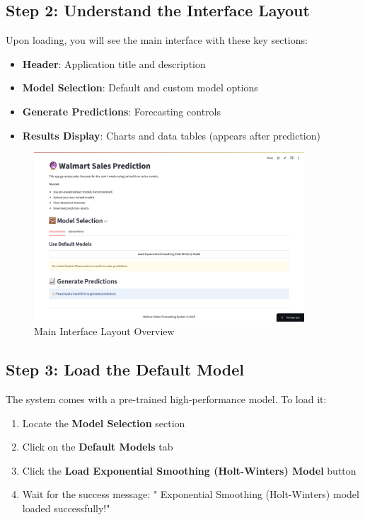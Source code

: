 \subsection{Step 2: Understand the Interface Layout}

Upon loading, you will see the main interface with these key sections:

\begin{itemize}
	\item \textbf{Header}: Application title and description
	\item \textbf{Model Selection}: Default and custom model options
	\item \textbf{Generate Predictions}: Forecasting controls
	\item \textbf{Results Display}: Charts and data tables (appears after prediction)
\end{itemize}

\begin{figure}[H]
	\centering
	\includegraphics[width=0.9\textwidth]{Images/03FirstStepsGuide/InterfaceLayout.png}
	\caption{Main Interface Layout Overview}
	\label{fig:interface_layout}
\end{figure}

\subsection{Step 3: Load the Default Model}

The system comes with a pre-trained high-performance model. To load it:

\begin{enumerate}
	\item Locate the \textbf{Model Selection} section
	\item Click on the \textbf{Default Models} tab
	\item Click the \textbf{Load Exponential Smoothing (Holt-Winters) Model} button
	\item Wait for the success message: "  Exponential Smoothing (Holt-Winters) model loaded successfully!"
\end{enumerate}

